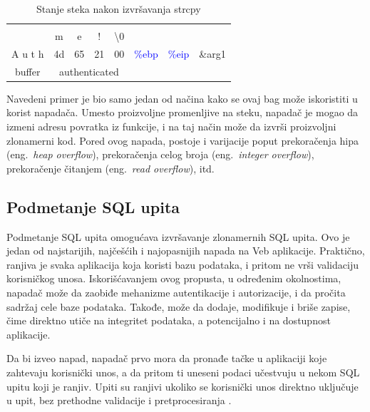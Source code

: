 \documentclass[a4paper]{article}
\begin{document}
\begin{table}[h!]
\begin{center}
\caption{Stanje steka nakon izvršavanja strcpy}
\begin{tabular}{|c|c|c|c|c|c|c|c|}
 \multicolumn{8}{c}{}\\
 \multicolumn{1}{c}{} & \multicolumn{1}{c}{m} & \multicolumn{1}{c}{e} & \multicolumn{1}{c}{!} & \multicolumn{1}{c}{\textbackslash0} & \multicolumn{3}{c}{}\\ \hline
A u t h & 4d & 65 & 21 & 00 & \textcolor{blue}{\%ebp} & \textcolor{blue}{\%eip} & \&arg1\\ \hline
 \multicolumn{1}{c}{buffer} & \multicolumn{4}{c}{authenticated} & \multicolumn{3}{c}{}\\
\end{tabular}
\label{tab:stack}
\end{center}
\end{table}

Navedeni primer je bio samo jedan od načina kako se ovaj bag može iskoristiti u korist napadača. Umesto proizvoljne promenljive na steku, napadač je mogao da izmeni adresu povratka iz funkcije, i na taj način može da izvrši proizvoljni zlonamerni kod. Pored ovog napada, postoje i varijacije poput prekoračenja hipa (eng.~{\em heap overflow}), prekoračenja celog broja (eng.~{\em integer overflow}), prekoračenje čitanjem (eng.~{\em read overflow}), itd.

\subsection{Podmetanje SQL upita}
\label{subsec:sqlinjection}
Podmetanje SQL upita omogućava izvršavanje zlonamernih SQL upita. Ovo je jedan od najstarijih, najčešćih i najopasnijih napada na Veb aplikacije. Praktično, ranjiva je svaka aplikacija koja koristi bazu podataka, i pritom ne vrši validaciju korisničkog unosa. Iskorišćavanjem ovog propusta, u određenim okolnostima, napadač može da zaobiđe mehanizme autentikacije i autorizacije, i da pročita sadržaj cele baze podataka. Takođe, može da dodaje, modifikuje i briše zapise, čime direktno utiče na integritet podataka, a potencijalno i na dostupnost aplikacije.

Da bi izveo napad, napadač prvo mora da pronađe tačke u aplikaciji koje zahtevaju korisnički unos, a da pritom ti uneseni podaci učestvuju u nekom SQL upitu koji je ranjiv. Upiti su ranjivi ukoliko se korisnički unos direktno uključuje u upit, bez prethodne validacije i pretprocesiranja \cite{sqlinjection1}.
\end{document}
